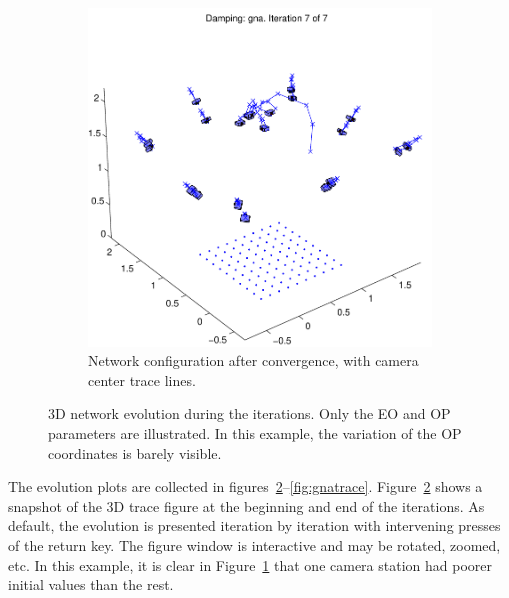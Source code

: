 \documentclass{article}
\begin{document}
\begin{figure}
\begin{subfigure}[b]{0.49\textwidth}
    \includegraphics[width=\textwidth]{ill/ccamxfinal}
    \caption{Network configuration after convergence, with camera
      center trace lines.}
    \label{fig:camxfinal}
  \end{subfigure}
  \caption{3D network evolution during the iterations. Only the EO and
    OP parameters are illustrated. In this example, the variation of
    the OP coordinates is barely visible. }\label{fig:net3DTrace}
\end{figure}

The evolution plots are collected in
figures~\ref{fig:net3DTrace}--\ref{fig:gnatrace}.
Figure~\ref{fig:net3DTrace} shows a snapshot of the 3D trace figure at
the beginning and end of the iterations. As default, the evolution is
presented iteration by iteration with intervening presses of the
return key. The figure window is interactive and may be rotated,
zoomed, etc. In this example, it is clear in
Figure~\ref{fig:camxfinal} that one camera station had poorer initial
values than the rest.
\end{document}
